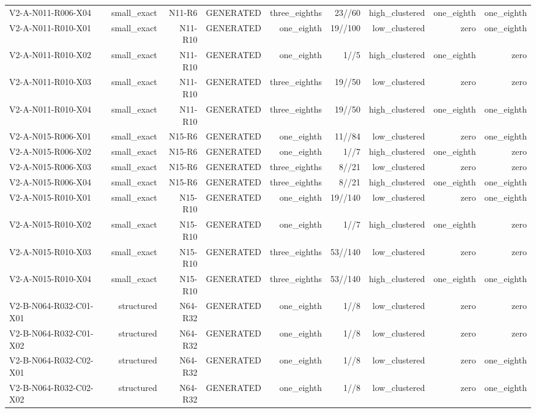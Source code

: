 {\begin{longtable}{lrrrrrrrr}
V2-A-N011-R006-X04 & small\_exact & N11-R6 & GENERATED & three\_eighths & 23//60 & high\_clustered & one\_eighth & one\_eighth \\
V2-A-N011-R010-X01 & small\_exact & N11-R10 & GENERATED & one\_eighth & 19//100 & low\_clustered & zero & one\_eighth \\
V2-A-N011-R010-X02 & small\_exact & N11-R10 & GENERATED & one\_eighth & 1//5 & high\_clustered & one\_eighth & zero \\
V2-A-N011-R010-X03 & small\_exact & N11-R10 & GENERATED & three\_eighths & 19//50 & low\_clustered & zero & zero \\
V2-A-N011-R010-X04 & small\_exact & N11-R10 & GENERATED & three\_eighths & 19//50 & high\_clustered & one\_eighth & one\_eighth \\
V2-A-N015-R006-X01 & small\_exact & N15-R6 & GENERATED & one\_eighth & 11//84 & low\_clustered & zero & one\_eighth \\
V2-A-N015-R006-X02 & small\_exact & N15-R6 & GENERATED & one\_eighth & 1//7 & high\_clustered & one\_eighth & zero \\
V2-A-N015-R006-X03 & small\_exact & N15-R6 & GENERATED & three\_eighths & 8//21 & low\_clustered & zero & zero \\
V2-A-N015-R006-X04 & small\_exact & N15-R6 & GENERATED & three\_eighths & 8//21 & high\_clustered & one\_eighth & one\_eighth \\
V2-A-N015-R010-X01 & small\_exact & N15-R10 & GENERATED & one\_eighth & 19//140 & low\_clustered & zero & one\_eighth \\
V2-A-N015-R010-X02 & small\_exact & N15-R10 & GENERATED & one\_eighth & 1//7 & high\_clustered & one\_eighth & zero \\
V2-A-N015-R010-X03 & small\_exact & N15-R10 & GENERATED & three\_eighths & 53//140 & low\_clustered & zero & zero \\
V2-A-N015-R010-X04 & small\_exact & N15-R10 & GENERATED & three\_eighths & 53//140 & high\_clustered & one\_eighth & one\_eighth \\
V2-B-N064-R032-C01-X01 & structured & N64-R32 & GENERATED & one\_eighth & 1//8 & low\_clustered & zero & zero \\
V2-B-N064-R032-C01-X02 & structured & N64-R32 & GENERATED & one\_eighth & 1//8 & low\_clustered & zero & zero \\
V2-B-N064-R032-C02-X01 & structured & N64-R32 & GENERATED & one\_eighth & 1//8 & low\_clustered & zero & one\_eighth \\
V2-B-N064-R032-C02-X02 & structured & N64-R32 & GENERATED & one\_eighth & 1//8 & low\_clustered & zero & one\_eighth \\

\end{longtable}}
